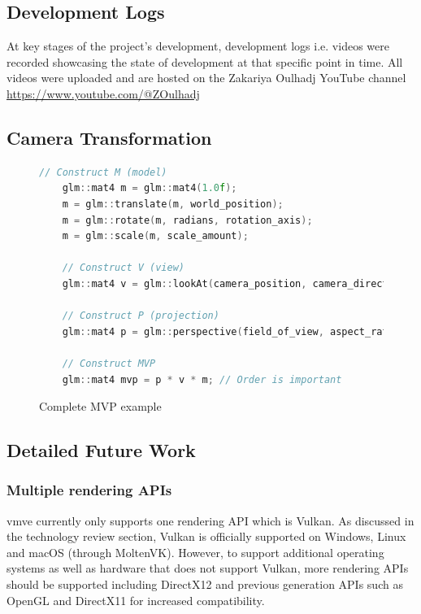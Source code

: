 \documentclass[11pt]{article}
\begin{document}
\subsection{Development Logs}
At key stages of the project's development, development logs i.e. videos were
recorded showcasing the state of development at that specific point in time. All
videos were uploaded and are hosted on the Zakariya Oulhadj YouTube channel
\href{https://www.youtube.com/@ZOulhadj}{https://www.youtube.com/@ZOulhadj}

\subsection{Camera Transformation}
\begin{figure}[H]
  \centering
  \begin{lstlisting}[language=C++]
    // Construct M (model)
    glm::mat4 m = glm::mat4(1.0f);
    m = glm::translate(m, world_position);   
    m = glm::rotate(m, radians, rotation_axis); 
    m = glm::scale(m, scale_amount);

    // Construct V (view)
    glm::mat4 v = glm::lookAt(camera_position, camera_direction, camera_up);

    // Construct P (projection)
    glm::mat4 p = glm::perspective(field_of_view, aspect_ratio, near, far);

    // Construct MVP
    glm::mat4 mvp = p * v * m; // Order is important

  \end{lstlisting}
  \caption{Complete MVP example}
  \label{fig:local_to_world_appendix}
\end{figure}

\subsection{Detailed Future Work} \label{detailed_future_work}

\subsubsection*{Multiple rendering APIs}
\gls*{vmve} currently only supports one rendering API which is Vulkan. As
discussed in the technology review section, Vulkan is officially supported on
Windows, Linux and macOS (through MoltenVK). However, to support additional
operating systems as well as hardware that does not support Vulkan, more
rendering APIs should be supported including DirectX12 and previous generation
APIs such as OpenGL and DirectX11 for increased compatibility.
\end{document}
